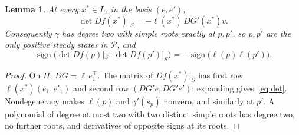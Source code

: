 \documentclass[11pt]{amsart}
\newtheorem{lemma}[theorem]{Lemma}
\theoremstyle{definition}
\theoremstyle{remark}
\begin{document}
\begin{lemma}\label{lem:det}
At every $x^*\in L$, in the basis $(e,e')$,
\begin{equation}\label{eq:det}
 \det Df(x^*)|_S=-\ell(x^*)\,DG'(x^*)v .
\end{equation}
Consequently $\gamma$ has degree two with simple roots exactly at $p,p'$, so $p,p'$ are the only positive steady states in $\mathcal P$, and
\[
 \operatorname{sign}\bigl(\det Df(p)|_S\cdot\det Df(p')|_S\bigr)=-\operatorname{sign}\bigl(\ell(p)\ell(p')\bigr).
\]
\end{lemma}

\begin{proof}
On $H$, $DG=\ell\,e_1^{\top}$. The matrix of $Df(x^*)|_S$ has first row $\ell(x^*)(e_1,e'_1)$ and second row $(DG'e,DG'e')$; expanding gives~\eqref{eq:det}. Nondegeneracy makes $\ell(p)$ and $\gamma'(s_p)$ nonzero, and similarly at $p'$. A polynomial of degree at most two with two distinct simple roots has degree two, no further roots, and derivatives of opposite signs at its roots.
\end{proof}
\end{document}
